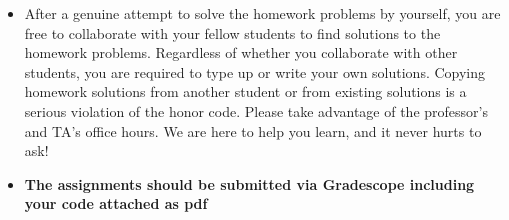 
\usepackage{hyperref}
\newtoggle{solution}
\toggletrue{solution} %


\newcommand{\hm}{{\hat\mu}}
\newcommand{\hS}{{\hat\Sigma}}

\def\alg{\mathcal{A}}
\def\R{\mathbb{R}}
\def\w{\mathbf{w}}
\def\x{\mathbf{x}}
\def\y{\mathbf{y}}
\def\z{\mathbf{z}}
\def\p{\mathbf{p}}
\def\EE{\mathbb{E}}
\def\PP{\mathbb{P}}





\begin{itemize}

\item After a genuine attempt to solve the homework problems by yourself, you are free to collaborate with your fellow students to find solutions to the homework problems. Regardless of whether you collaborate with other students, you are required to type up or write your own solutions. Copying homework solutions from another student or from existing solutions is a serious violation of the honor code. Please take advantage of  the professor's and TA's office hours. We are here to help you learn, and it never hurts to ask!
\item {\bf  The assignments should be submitted via Gradescope including your code attached as pdf}
\end{itemize}


